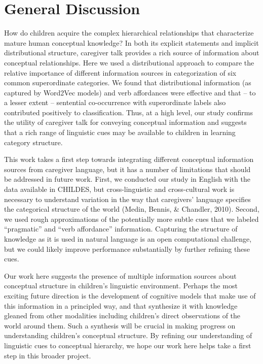 \documentclass[english,,man,floatsintext]{apa6}
\begin{document}
\hypertarget{general-discussion}{%
\section{General Discussion}\label{general-discussion}}

How do children acquire the complex hierarchical relationships that characterize mature human conceptual knowledge? In both its explicit statements and implicit distributional structure, caregiver talk provides a rich source of information about conceptual relationships. Here we used a distributional approach to compare the relative importance of different information sources in categorization of six common superordinate categories. We found that distributional information (as captured by Word2Vec models) and verb affordances were effective and that -- to a lesser extent -- sentential co-occurrence with superordinate labels also contributed positively to classification. Thus, at a high level, our study confirms the utility of caregiver talk for conveying conceptual information and suggests that a rich range of linguistic cues may be available to children in learning category structure.

This work takes a first step towards integrating different conceptual information sources from caregiver language, but it has a number of limitations that should be addressed in future work. First, we conducted our study in English with the data available in CHILDES, but cross-linguistic and cross-cultural work is necessary to understand variation in the way that caregivers' language specifies the categorical structure of the world (Medin, Bennis, \& Chandler, 2010). Second, we used rough approximations of the potentially more subtle cues that we labeled \enquote{pragmatic} and \enquote{verb affordance} information. Capturing the structure of knowledge as it is used in natural language is an open computational challenge, but we could likely improve performance substantially by further refining these cues.

Our work here suggests the presence of multiple information sources about conceptual structure in children's linguistic environment. Perhaps the most exciting future direction is the development of cognitive models that make use of this information in a principled way, and that synthesize it with knowledge gleaned from other modalities including children's direct observations of the world around them. Such a synthesis will be crucial in making progress on understanding children's conceptual structure. By refining our understanding of linguistic cues to conceptual hierarchy, we hope our work here helps take a first step in this broader project.
\end{document}
